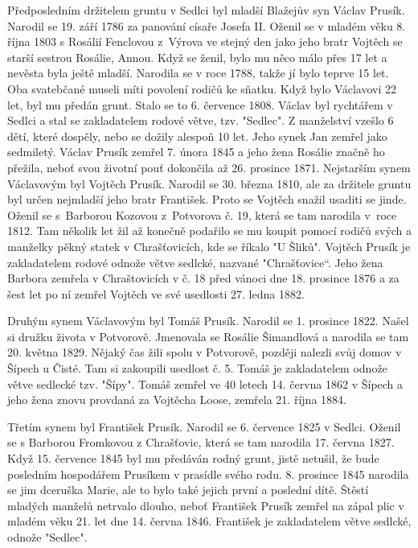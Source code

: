 \documentclass[../dejiny-rodu-prusiku.tex]{subfiles}
\begin{document}
Předposledním držitelem gruntu v Sedlci byl mladší Blaže­jův syn Václav Prusík. Narodil se 19. září 1786 za panování císaře Josefa II. Oženil se v mladém věku 8. října 1803 s Rosálií Fenclovou z~Výrova ve stejný den jako jeho bratr Vojtěch se starší sestrou Rosálie, Annou. Když se ženil, bylo mu něco málo přes 17 let a nevěsta byla ještě mladší. Narodila se v roce 1788, takže jí bylo teprve 15 let. Oba svatebčané museli míti povo­lení rodičů ke sňatku. Když bylo Václavovi 22 let, byl mu předán grunt. Stalo se to 6. července 1808. Václav byl rychtářem v Sedlci a stal se zakladatelem rodové větve, tzv. "Sedlec". Z manželství vzešlo 6 dětí, které dospěly, nebo se dožily alespoň 10 let. Jeho synek Jan zemřel ja­ko sedmiletý. Václav Prusík zemřel 7. února 1845 a jeho žena Rosálie značně ho přežila, neboť svou životní pouť dokončila až 26. prosince 1871.
Nejstarším synem Václavovým byl Vojtěch Prusík. Narodil se 30. března 1810, ale za držitele gruntu byl určen nejmladší jeho bratr František. Proto se Vojtěch snažil usaditi se jinde. Oženil se s~Barborou Kozovou z~Potvorova č. 19, která se tam narodila v~roce 1812. Tam několik let žil až konečně podařilo se mu koupit pomocí rodičů svých a manželky pěkný statek v Chrašťovicích, kde se říkalo "U Šliků". Vojtěch Prusík je zakladatelem rodové odnože větve sedlcké, nazvané "Chrašťovice“. Jeho žena Barbora zemřela v Chraštovicích v č. 18 před vánoci dne 18. prosince 1876 a za šest let po ní zemřel Vojtěch ve své usedlosti 27. ledna 1882.

Druhým synem Václavovým byl Tomáš Prusík. Narodil se 1. prosince 1822. Našel si družku života v Potvorově. Jmenovala se Rosálie Šimandlová a narodila se tam 20. května 1829. Nějaký čas žili spolu v Potvo­rově, později nalezli svůj domov v Šípech u Čisté. Tam si zakoupili usedlost č. 5. Tomáš je zakladatelem odnože větve sedlecké tzv. "Šípy". Tomáš zemřel ve 40 letech 14. června 1862 v Šípech a jeho žena znovu provda­ná za Vojtěcha Loose, zemřela 21. října 1884.

Třetím synem byl František Prusík. Narodil se 6. července 1825 v Sedlci. Oženil se s Barbo­rou Fromkovou z Chrašťovic, která se tam narodila 17. června 1827. Když 15. července 1845 byl mu předáván rodný grunt, jistě netušil, že bude posledním hospodářem Prusíkem v prasídle svého rodu. 8. prosince 1845 narodila se jim dceruška Marie, ale to bylo také je­jich první a poslední dítě. Štěstí mladých manželů netrvalo dlouho, neboť  František Prusík zemřel na zá­pal plic v mladém věku 21. let dne 14. června 1846. Franti­šek je zakladatelem větve sedlcké, odnože "Sedlec".
\end{document}
